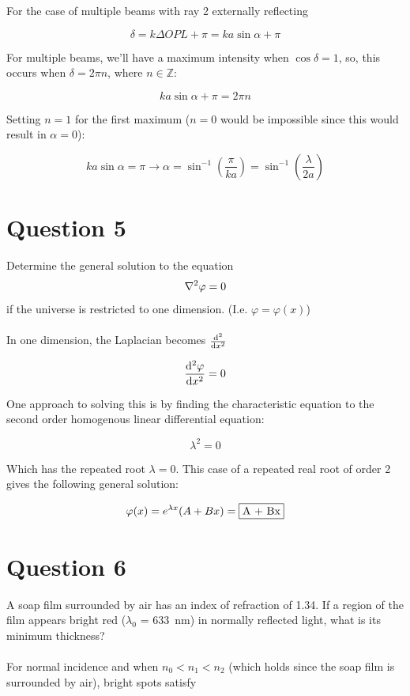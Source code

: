 \documentclass[a4paper]{article}
\begin{document}
For the case of multiple beams with ray 2 externally reflecting

\[
    \delta = k \Delta OPL + \pi = ka \sin \alpha + \pi
\]

For multiple beams, we'll have a maximum intensity when $\cos \delta = 1$, so, this occurs when $\delta = 2 \pi n$, where $n\in\mathbb{Z}$:

\[
    ka \sin \alpha + \pi = 2 \pi n
\]

Setting $n=1$ for the first maximum ($n=0$ would be impossible since this would result in $\alpha = 0$):

\[
    ka \sin \alpha = \pi \rightarrow \alpha = \sin^{-1}\left(\frac{\pi}{ka} \right) = \sin^{-1}\left(\frac{\lambda}{2a} \right)
\]


\section*{Question 5}
Determine the general solution to the equation
\[
    \laplacian \varphi = 0
\]
if the universe is restricted to one dimension. (I.e. $\varphi = \varphi(x)$) \\\\

In one dimension, the Laplacian becomes $\dv[2]{x}$

\[
    \dv[2]{\varphi}{x} = 0
\]

One approach to solving this is by finding the characteristic equation to the second order homogenous linear differential equation:

\[
    \lambda^2 = 0
\]

Which has the repeated root $\lambda = 0$. This case of a repeated real root of order 2 gives the following general solution:

\[
    \varphi(x) = e^{\lambda x}(A + Bx) = \fbox{A + Bx}
\]

\section*{Question 6}
A soap film surrounded by air has an index of refraction of 1.34. If a region of the film appears bright
red ($\lambda_0$ = \qty{633}{nm}) in normally reflected light, what is its minimum thickness? \\\\

For normal incidence and when $n_0<n_1<n_2$ (which holds since the soap film is surrounded by air), bright spots satisfy
\end{document}

